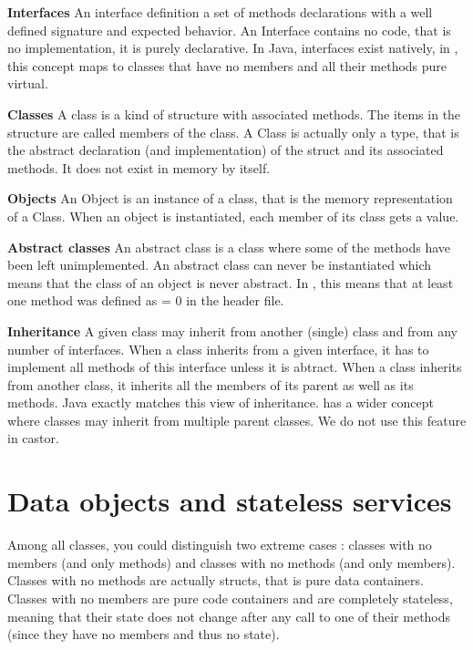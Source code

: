 \begin{description}
\item{\bf Interfaces} An interface definition a set of methods declarations
with a well defined signature and expected behavior. An Interface contains
no code, that is no implementation, it is purely declarative.
In Java, interfaces exist natively, in \cpp, this concept maps
to classes that have no members and all their methods pure virtual.
\item{\bf Classes} A class is a kind of structure with associated methods.
The items in the structure are called members of the class.
A Class is actually only a type, that is the abstract declaration
(and implementation) of the struct and its associated methods. It does
not exist in memory by itself.
\item{\bf Objects} An Object is an instance of a class, that is the
memory representation of a Class. When an object is instantiated,
each member of its class gets a value.
\item{\bf Abstract classes} An abstract class is a class where some of the
methods have been left unimplemented. An abstract class can never be
instantiated which means that the class of an object is never abstract.
In \cpp, this means that at least one method was defined as = 0 in the
header file.
\item{\bf Inheritance} A given class may inherit from another (single) class
and from any number of interfaces. When a class inherits from a given
interface, it has to implement all methods of this interface unless it is
abtract. When a class inherits from another class, it inherits all the members
of its parent as well as its methods.
Java exactly matches this view of inheritance. \cpp has a wider concept
where classes may inherit from multiple parent classes. We do not
use this feature in castor.
\end{description}


\section{Data objects and stateless services}

Among all classes, you could distinguish two extreme cases : classes
with no members (and only methods) and classes with no methods
(and only members). Classes with no methods are actually structs,
that is pure data containers. Classes with no members are pure
code containers and are completely stateless, meaning that their
state does not change after any call to one of their methods (since
they have no members and thus no state).


